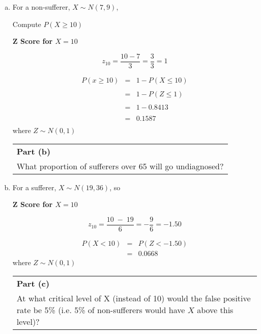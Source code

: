 \documentclass[a4paper,12pt]{article}
\begin{document}
\begin{enumerate}[(a)]
\item For a non-sufferer, $X\sim N(7,9)$,

Compute $P(X \geq 10)$

\begin{framed}

\noindent \textbf{Z Score for $X = 10$}

\[z_{10}  = \frac{10-7}{ 3}  = \frac{3}{3} = 1\]
\end{framed}
\begin{eqnarray*}
P(x \geq 10 ) &=&  1- P(X \leq 10)
\\ & &
\\ &=&  1 - P(Z \leq 1)
\\ & & 
\\ &=& 1 - 0.8413
\\ & &
\\ &=& 0.1587 \\
\end{eqnarray*}
where $Z\sim N(0,1)$
\newpage
\begin{table}[ht!]
     \centering
     \begin{tabular}{|p{15cm}|}
     \hline        \large
 \noindent \textbf{Part (b)}\\ \large
\noindent What proportion of sufferers over 65 will go undiagnosed? \smallskip
\\ \hline
 \end{tabular}
\end{table}

\item For a sufferer, $X\sim N(19,36)$, so


\begin{framed}

\noindent \textbf{Z Score for $X = 10$}

\[z_{10}  = \frac{10\;-\;19}{ 6}  = -\frac{9}{6} = -1.50\]
\end{framed}

\begin{eqnarray*}
P(X<10) 
&=& P(Z < -1.50 )\\ &=& 0.0668
\end{eqnarray*}
where $Z\sim N(0,1)$

\newpage
\begin{table}[ht!]
     \centering
     \begin{tabular}{|p{15cm}|}
     \hline        \large
 \noindent \textbf{Part (c)}\\ \large
\noindent At what critical level of X (instead of 10) would the false positive rate be 5\% (i.e. 5\% of non-sufferers would have $X$ above this level)?


\end{tabular}
\end{table}
\end{enumerate}
\end{document}
